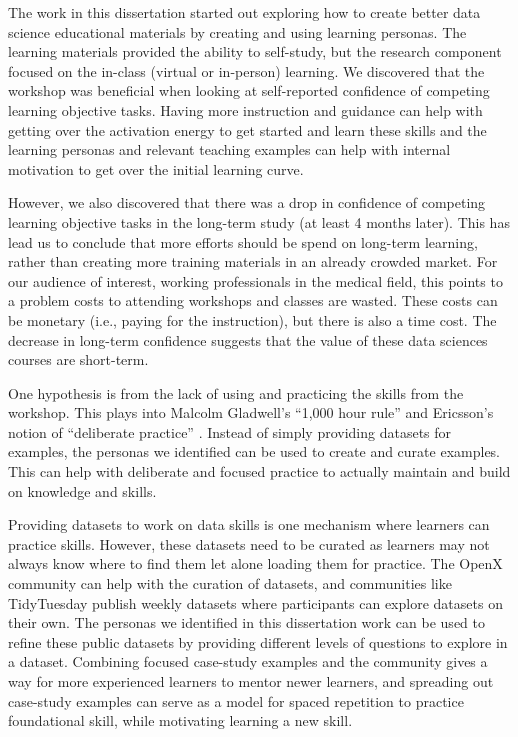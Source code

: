 \documentclass[../main.tex]{subfiles}
\begin{document}
The work in this dissertation started out exploring how to create better data science educational materials
by creating and using learning personas.
The learning materials provided the ability to self-study,
but the research component focused on the in-class (virtual or in-person) learning.
We discovered that the workshop was beneficial when looking at self-reported confidence of competing learning objective tasks.
Having more instruction and guidance can help with getting over the activation energy to get started and learn these skills
and the learning personas and relevant teaching examples can help with internal motivation
to get over the initial learning curve.

However, we also discovered that there was a drop in confidence of competing learning objective tasks
in the long-term study (at least 4 months later).
This has lead us to conclude that more efforts should be spend on long-term learning,
rather than creating more training materials in an already crowded market.
For our audience of interest, working professionals in the medical field,
this points to a problem costs to attending workshops and classes are wasted.
These costs can be monetary (i.e., paying for the instruction), but there is also a time cost.
The decrease in long-term confidence suggests that the value of these data sciences courses are short-term.

One hypothesis is from the lack of using and practicing the skills from the workshop.
This plays into Malcolm Gladwell's ``1,000 hour rule'' and Ericsson's notion of ``deliberate practice''
\cite{gladwellOutliersStorySuccess2011, ericssonDeliberatePracticeProposed2019, ericssonExpertExceptionalPerformance1996}.
Instead of simply providing datasets for examples,
the personas we identified can be used to create and curate examples.
This can help with deliberate and focused practice to actually maintain and build on knowledge and skills.

Providing datasets to work on data skills is one mechanism where learners can practice skills.
However, these datasets need to be curated as learners may not always know where to find them let alone loading them for practice.
The OpenX community can help with the curation of datasets,
and communities like TidyTuesday publish weekly datasets where participants can explore datasets on their own.
The personas we identified in this dissertation work can be used to refine these public datasets
by providing different levels of questions to explore in a dataset.
Combining focused case-study examples and the community gives a way for more experienced learners to mentor newer learners,
and spreading out case-study examples can serve as a model for spaced repetition to practice foundational skill,
while motivating learning a new skill.
\end{document}
